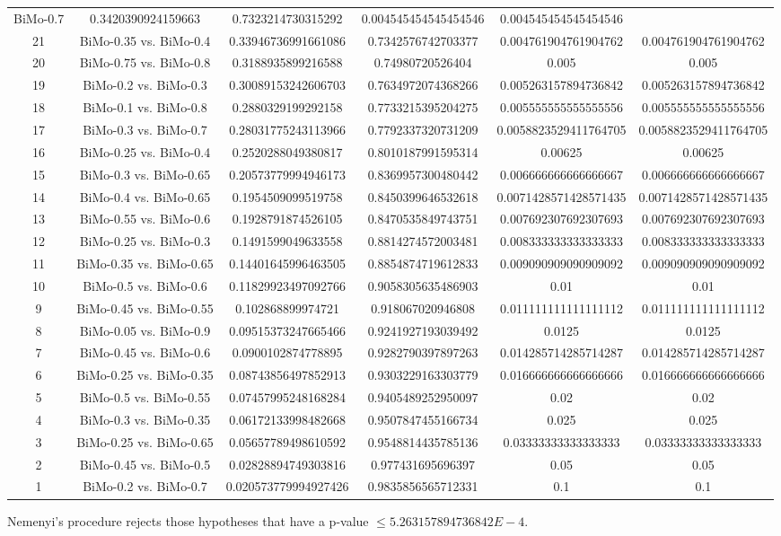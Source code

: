 \documentclass[a4paper,10pt]{article}
\begin{document}
\begin{landscape}
\begin{table}[!htp]
\begin{tabular}{cccccc}
BiMo-0.7&0.3420390924159663&0.7323214730315292&0.004545454545454546&0.004545454545454546\\21&BiMo-0.35 vs. BiMo-0.4&0.33946736991661086&0.7342576742703377&0.004761904761904762&0.004761904761904762\\20&BiMo-0.75 vs. BiMo-0.8&0.3188935899216588&0.74980720526404&0.005&0.005\\19&BiMo-0.2 vs. BiMo-0.3&0.30089153242606703&0.7634972074368266&0.005263157894736842&0.005263157894736842\\18&BiMo-0.1 vs. BiMo-0.8&0.2880329199292158&0.7733215395204275&0.005555555555555556&0.005555555555555556\\17&BiMo-0.3 vs. BiMo-0.7&0.28031775243113966&0.7792337320731209&0.0058823529411764705&0.0058823529411764705\\16&BiMo-0.25 vs. BiMo-0.4&0.2520288049380817&0.8010187991595314&0.00625&0.00625\\15&BiMo-0.3 vs. BiMo-0.65&0.20573779994946173&0.8369957300480442&0.006666666666666667&0.006666666666666667\\14&BiMo-0.4 vs. BiMo-0.65&0.1954509099519758&0.8450399646532618&0.0071428571428571435&0.0071428571428571435\\13&BiMo-0.55 vs. BiMo-0.6&0.1928791874526105&0.8470535849743751&0.007692307692307693&0.007692307692307693\\12&BiMo-0.25 vs. BiMo-0.3&0.1491599049633558&0.8814274572003481&0.008333333333333333&0.008333333333333333\\11&BiMo-0.35 vs. BiMo-0.65&0.14401645996463505&0.8854874719612833&0.009090909090909092&0.009090909090909092\\10&BiMo-0.5 vs. BiMo-0.6&0.11829923497092766&0.9058305635486903&0.01&0.01\\9&BiMo-0.45 vs. BiMo-0.55&0.102868899974721&0.918067020946808&0.011111111111111112&0.011111111111111112\\8&BiMo-0.05 vs. BiMo-0.9&0.09515373247665466&0.9241927193039492&0.0125&0.0125\\7&BiMo-0.45 vs. BiMo-0.6&0.0900102874778895&0.9282790397897263&0.014285714285714287&0.014285714285714287\\6&BiMo-0.25 vs. BiMo-0.35&0.08743856497852913&0.9303229163303779&0.016666666666666666&0.016666666666666666\\5&BiMo-0.5 vs. BiMo-0.55&0.07457995248168284&0.9405489252950097&0.02&0.02\\4&BiMo-0.3 vs. BiMo-0.35&0.06172133998482668&0.9507847455166734&0.025&0.025\\3&BiMo-0.25 vs. BiMo-0.65&0.05657789498610592&0.9548814435785136&0.03333333333333333&0.03333333333333333\\2&BiMo-0.45 vs. BiMo-0.5&0.02828894749303816&0.977431695696397&0.05&0.05\\1&BiMo-0.2 vs. BiMo-0.7&0.020573779994927426&0.9835856565712331&0.1&0.1\\\hline
\end{tabular}
\end{table}
Nemenyi's procedure rejects those hypotheses that have a p-value $\le5.263157894736842E-4$.



\end{landscape}
\end{document}
